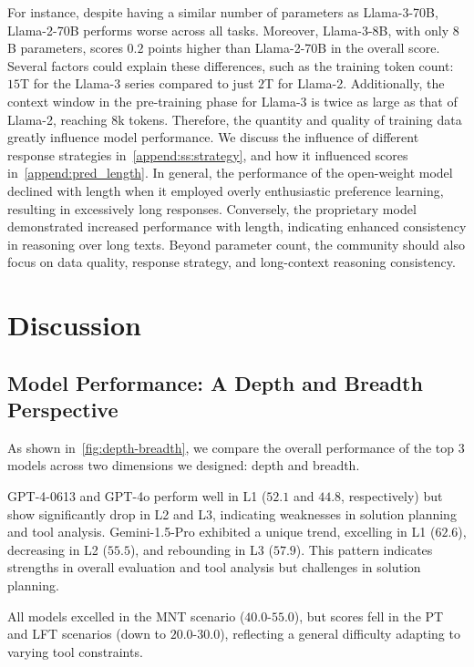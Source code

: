\documentclass[11pt]{article}
\begin{document}
For instance, despite having a similar number of parameters as Llama-3-70B, Llama-2-70B performs worse across all tasks. 
Moreover, Llama-3-8B, with only $8$B parameters, scores $0.2$ points higher than Llama-2-70B in the overall score. 
Several factors could explain these differences, such as the training token count: $15$T for the Llama-3 series compared to just $2$T for Llama-2. Additionally, the context window in the pre-training phase for Llama-3 is twice as large as that of Llama-2, reaching $8$k tokens. 
Therefore, the quantity and quality of training data greatly influence model performance. 
We discuss the influence of different response strategies in~\cref{append:ss:strategy}, and how it influenced scores in~\cref{append:pred_length}.
In general, the performance of the open-weight model declined with length when it employed overly enthusiastic preference learning, resulting in excessively long responses. 
Conversely, the proprietary model demonstrated increased performance with length, indicating enhanced consistency in reasoning over long texts.
Beyond parameter count, the community should also focus on data quality, response strategy, and long-context reasoning consistency.

\section{Discussion}
\label{discussion}
\subsection{Model Performance: A Depth and Breadth Perspective}

As shown in~\cref{fig:depth-breadth}, we compare the overall performance of the top $3$ models across two dimensions we designed: depth and breadth.

GPT-4-0613 and GPT-4o perform well in L1 ($52.1$ and $44.8$, respectively) but show significantly drop in L2 and L3, indicating weaknesses in solution planning and tool analysis.
Gemini-1.5-Pro exhibited a unique trend, excelling in L1 ($62.6$), decreasing in L2 ($55.5$), and rebounding in L3 ($57.9$).
This pattern indicates strengths in overall evaluation and tool analysis but challenges in solution planning.

All models excelled in the MNT scenario ($40.0$-$55.0$), but scores fell in the PT and LFT scenarios (down to $20.0$-$30.0$), reflecting a general difficulty adapting to varying tool constraints.
\end{document}
